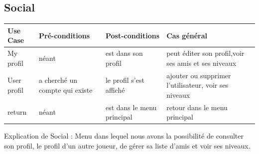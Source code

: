 \documentclass[french]{article}
\begin{document}
\subsection{Social}
\label{use case:Social}
\begin{longtable}{|p{}|p{}|p{}|p{}|}
  \toprule
  \rowcolor{lightgray}
  \textbf{Use Case} & \textbf{Pré-conditions} & \textbf{Post-conditions}& \textbf{Cas général}\\
  \midrule
  My profil & néant & est dans son profil & peut éditer son profil,voir ses amis et ses niveaux\\
  \hline
  User profil & a cherché un compte qui existe & le profil s'est affiché  & ajouter ou supprimer l'utilisateur, voir ses niveaux\\
  \hline
  return & néant & est dans le menu principal & retour dans le menu principal\\
  \bottomrule
\end{longtable}
\begin{center}
Explication de Social : Menu dans lequel nous avons la possibilité de consulter son profil, le profil d'un autre joueur, de gérer sa liste d'amis et voir ses niveaux.
\end{center}
\newpage
\end{document}
